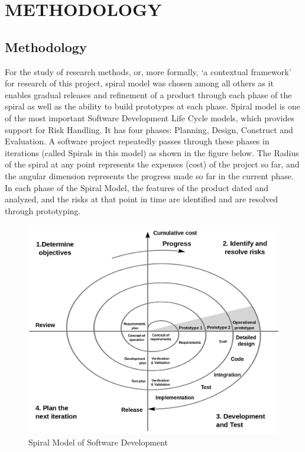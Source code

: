 \chapter{METHODOLOGY}
\section{Methodology}

For the study of research methods, or, more formally, ‘a contextual framework' for research of this project, spiral model was chosen among all others as it enables gradual releases and refinement of a product through each phase of the spiral as well as the ability to build prototypes at each phase. Spiral model is one of the most important Software Development Life Cycle models, which provides support for Risk Handling. It has four phases: Planning, Design, Construct and Evaluation. A software project repeatedly passes through these phases in iterations (called Spirals in this model) as shown in the figure below. The Radius of the spiral at any point represents the expenses (cost) of the project so far, and the angular dimension represents the progress made so far in the current phase. In each phase of the Spiral Model, the features of the product dated and analyzed, and the risks at that point in time are identified and are resolved through prototyping.
\vspace{0.2cm}
\begin{figure}[h]
    \centering
    \includegraphics[width=120mm]{images/spiral.png}
    \caption{Spiral Model of Software Development}
    \label{fig:Spiral Model}
\end{figure}
